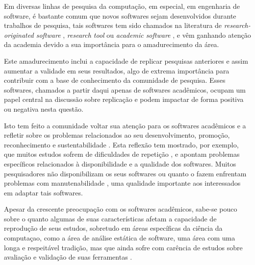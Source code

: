 
Em diversas linhas de pesquisa da computação, em especial, em engenharia de
software, é bastante comum que novos softwares sejam desenvolvidos durante
trabalhos de pesquisa, tais softwares tem sido chamados na literatura de {\it
research-originated software} \cite{Kon2011}, {\it research tool}
\cite{Portillo12} ou {\it academic software} \cite{allen2017engineering}, e vêm
ganhando atenção da academia devido a sua importância para o amadurecimento da
área.

Este amadurecimento inclui a capacidade de replicar pesquisas anteriores e
assim aumentar a validade em seus resultados, algo de extrema importância para
contribuir com a base de conhecimento da comunidade de pesquisa. Esses
softwares, chamados a partir daqui apenas de softwares acadêmicos, ocupam um
papel central na discussão sobre replicação \cite{Stodden2009, Peng2011} e
podem impactar de forma positiva ou negativa nesta questão.

Isto tem feito a comunidade voltar sua atenção para os softwares acadêmicos e a
refletir sobre os problemas relacionados ao seu desenvolvimento, promoção,
reconhecimento e sustentabilidade \cite{allen2017engineering}. Esta reflexão
tem mostrado, por exemplo, que muitos estudos sofrem de dificuldades de
repetição \cite{Tang2016}, e apontam problemas específicos relacionados à
disponibilidade e a qualidade dos softwares. Muitos pesquisadores não
disponibilizam os seus softwares \cite{robles2010replicating,
amann2015software} ou quanto o fazem enfrentam problemas com manutenabilidade
\cite{Prlic2012}, uma qualidade importante aos interessados em adaptar tais
softwares.

Apesar da crescente preocupação com os softwares acadêmicos, sabe-se pouco
sobre o quanto algumas de suas características afetam a capacidade de
reprodução de seus estudos, sobretudo em áreas específicas da ciência da
computaçao, como a área de análise estática de software, uma área com uma longa
e respeitável tradição, mas que ainda sofre com carência de estudos sobre
avaliação e validação de suas ferramentas \cite{Li2010, ilyas2016static}.

